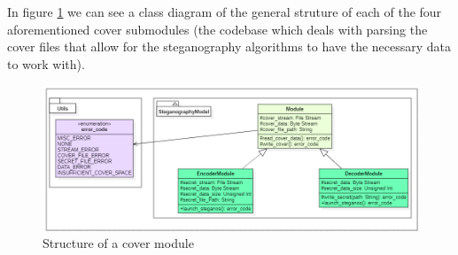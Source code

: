 \begin{multicols}{2}
In figure \ref{cover_module_overview} we can see a class diagram of the general struture of each of the four aforementioned cover submodules (the codebase which deals with parsing the cover files that allow for the steganography algorithms to have the necessary data to work with). 
\end{multicols}
\begin{figure}[H]
    \centering
    \includegraphics[width=16cm,keepaspectratio]{pics/application_chapter/diagrama_module_interface}
    \caption{Structure of a cover module}
    \label{cover_module_overview}
\end{figure}

